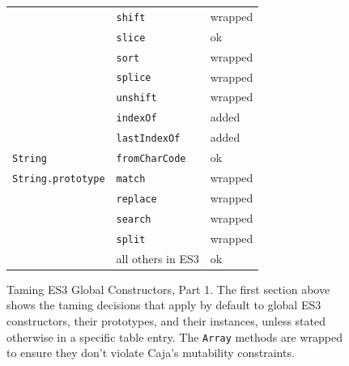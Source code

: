 \documentclass[letterpaper,twocolumn,10pt]{article}
\newcommand{\code}[1]{{\tt {#1}}}              %
\begin{document}
\begin{figure}
\begin{tabular}{lll}
                                 & \code{shift}                & wrapped \\
                                 & \code{slice}                & ok \\
                                 & \code{sort}                 & wrapped \\
                                 & \code{splice}               & wrapped \\
                                 & \code{unshift}              & wrapped \\
                                 & \code{indexOf}              & added \\
                                 & \code{lastIndexOf}          & added \\
  \hline
  \code{String}                  & \code{fromCharCode}         & ok \\
  \code{String.prototype}        & \code{match}                & wrapped \\
                                 & \code{replace}              & wrapped \\
                                 & \code{search}               & wrapped \\
                                 & \code{split}                & wrapped \\
                                 &           all others in ES3 & ok \\
\end{tabular}

\caption[Taming ES3 Global Constructors, Part 1.]{Taming ES3 Global
Constructors, Part 1. The first section above shows the taming
decisions that apply by default to global ES3 constructors, their prototypes,
and their instances, unless stated otherwise in a specific table entry. The
\code{Array} methods are wrapped to ensure they don't violate Caja's
mutability constraints.}
\label{tab:taming-es3-1}
\end{figure}
\end{document}
